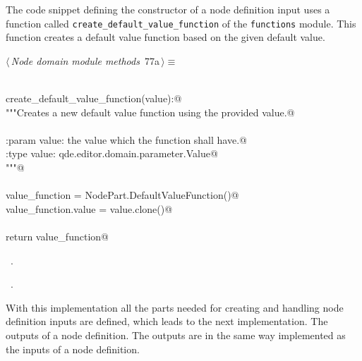 \documentclass[
    a4paper,      %
    10pt,         %
    openright,    %
    notitlepage,  %
    parskip=half, %
]{scrreprt}       %
\theoremstyle{definition}                    %
\begin{document}
The code snippet defining the constructor of a node definition input uses a
function called \verb+create_default_value_function+ of the \verb+functions+
module. This function creates a default value function based on the given
default value.

\begin{flushleft} \small
\begin{minipage}{\linewidth}\label{scrap126}\raggedright\small
{} $\langle\,${\itshape Node domain module methods}\nobreak\ {\footnotesize {77a}}$\,\rangle\equiv$
\vspace{-1exm}
\begin{list}{}{} \item
\mbox{}\lstinline@@\\
\mbox{}\lstinline@def create_default_value_function(value):@\\
\mbox{}\lstinline@    """Creates a new default value function using the provided value.@\\
\mbox{}\lstinline@@\\
\mbox{}\lstinline@    :param value: the value which the function shall have.@\\
\mbox{}\lstinline@    :type  value: qde.editor.domain.parameter.Value@\\
\mbox{}\lstinline@    """@\\
\mbox{}\lstinline@@\\
\mbox{}\lstinline@    value_function = NodePart.DefaultValueFunction()@\\
\mbox{}\lstinline@    value_function.value = value.clone()@\\
\mbox{}\lstinline@@\\
\mbox{}\lstinline@    return value_function@{\NWsep}
\end{list}
\vspace{-1.5ex}
\footnotesize
\begin{list}{}{\setlength{\itemsep}{-\parsep}\setlength{\itemindent}{-\leftmargin}}
\item \NWtxtMacroDefBy\ .
\item \NWtxtMacroRefIn\ .

\item{}
\end{list}
\end{minipage}\vspace{4ex}
\end{flushleft}
With this implementation all the parts needed for creating and handling node
definition inputs are defined, which leads to the next implementation. The
outputs of a node definition. The outputs are in the same way implemented as
the inputs of a node definition.
\end{document}
